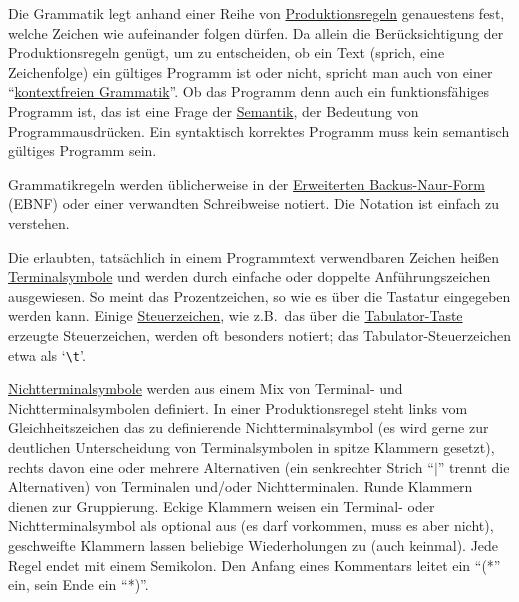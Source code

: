 Die Grammatik legt anhand einer Reihe von \href{http://de.wikipedia.org/wiki/Produktionsregel}{Produktionsregeln} genauestens fest, welche Zeichen wie aufeinander folgen dürfen. Da allein die Berücksichtigung der Produktionsregeln genügt, um zu entscheiden, ob ein Text (sprich, eine Zeichenfolge) ein gültiges Programm ist oder nicht, spricht man auch von einer "`\href{http://de.wikipedia.org/wiki/Kontextfreie\_Grammatik}{kontextfreien Grammatik}"'. Ob das Programm denn auch ein funktionsfähiges Programm ist, das ist eine Frage der \href{http://de.wikipedia.org/wiki/Semantik#Semantik\_in\_formalen\_Sprachen}{Semantik}, der Bedeutung von Programmausdrücken. Ein syntaktisch korrektes Programm muss kein semantisch gültiges Programm sein.


Grammatikregeln werden üblicherweise in der \href{http://de.wikipedia.org/wiki/Erweiterte\_Backus-Naur-Form}{Erweiterten Backus-Naur-Form} (EBNF) oder einer verwandten Schreibweise notiert. Die Notation ist einfach zu verstehen. 

Die erlaubten, tatsächlich in einem Programmtext verwendbaren Zeichen heißen \href{http://de.wikipedia.org/wiki/Terminalsymbol}{Terminalsymbole} und werden durch einfache oder doppelte Anführungszeichen ausgewiesen. So meint \lit{\%}
das Prozentzeichen, so wie es über die Tastatur eingegeben werden kann. Einige \href{http://de.wikipedia.org/wiki/Steuerzeichen}{Steuerzeichen}, wie z.B.\ das über die \href{http://de.wikipedia.org/wiki/Tabulatortaste}{Tabulator-Taste} erzeugte Steuerzeichen, werden oft besonders notiert; das Tabulator-Steuerzeichen etwa als `\verb|\t|'.

\href{http://de.wikipedia.org/wiki/Nichtterminalsymbol}{Nichtterminalsymbole} werden aus einem Mix von Terminal- und Nichtterminalsymbolen definiert. In einer Produktionsregel steht links vom Gleichheitszeichen das zu definierende Nichtterminalsymbol (es wird gerne zur deutlichen Unterscheidung von Terminalsymbolen in spitze Klammern gesetzt), rechts davon eine oder mehrere Alternativen (ein senkrechter Strich "`$|$"' trennt die Alternativen) von Terminalen und\slash oder Nichtterminalen. Runde Klammern dienen zur Gruppierung. Eckige Klammern weisen ein Terminal- oder Nichtterminalsymbol als optional aus (es darf vorkommen, muss es aber nicht), geschweifte Klammern lassen beliebige Wiederholungen zu (auch keinmal). Jede Regel endet mit einem Semikolon. Den Anfang eines Kommentars leitet ein "`(*"' ein, sein Ende ein "`*)"'.

